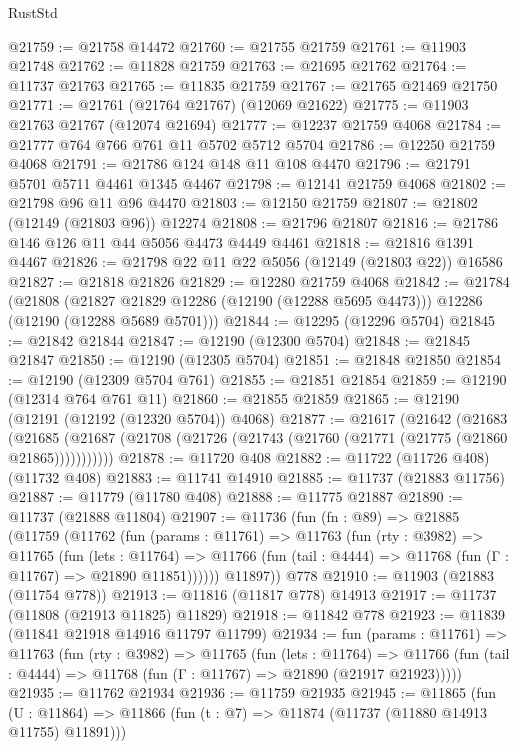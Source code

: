 \begin{lexlean}{RustStd}
\begin{coremodule}
@21759 := @21758 @14472
@21760 := @21755 @21759
@21761 := @11903 @21748
@21762 := @11828 @21759
@21763 := @21695 @21762
@21764 := @11737 @21763
@21765 := @11835 @21759
@21767 := @21765 @21469 @21750
@21771 := @21761 (@21764 @21767) (@12069 @21622)
@21775 := @11903 @21763 @21767 (@12074 @21694)
@21777 := @12237 @21759 @4068
@21784 := @21777 @764 @766 @761 @11 @5702 @5712 @5704
@21786 := @12250 @21759 @4068
@21791 := @21786 @124 @148 @11 @108 @4470
@21796 := @21791 @5701 @5711 @4461 @1345 @4467
@21798 := @12141 @21759 @4068
@21802 := @21798 @96 @11 @96 @4470
@21803 := @12150 @21759
@21807 := @21802 (@12149 (@21803 @96)) @12274
@21808 := @21796 @21807
@21816 := @21786 @146 @126 @11 @44 @5056 @4473 @4449 @4461
@21818 := @21816 @1391 @4467
@21826 := @21798 @22 @11 @22 @5056 (@12149 (@21803 @22)) @16586
@21827 := @21818 @21826
@21829 := @12280 @21759 @4068
@21842 := @21784
    (@21808
      (@21827 @21829 @12286 (@12190 (@12288 @5695 @4473)))
      @12286
      (@12190 (@12288 @5689 @5701)))
@21844 := @12295 (@12296 @5704)
@21845 := @21842 @21844
@21847 := @12190 (@12300 @5704)
@21848 := @21845 @21847
@21850 := @12190 (@12305 @5704)
@21851 := @21848 @21850
@21854 := @12190 (@12309 @5704 @761)
@21855 := @21851 @21854
@21859 := @12190 (@12314 @764 @761 @11)
@21860 := @21855 @21859
@21865 := @12190 (@12191 (@12192 (@12320 @5704)) @4068)
@21877 := @21617
    (@21642
      (@21683
        (@21685 (@21687 (@21708 (@21726 (@21743 (@21760 (@21771 (@21775 (@21860 @21865)))))))))))
@21878 := @11720 @408
@21882 := @11722 (@11726 @408) (@11732 @408)
@21883 := @11741 @14910
@21885 := @11737 (@21883 @11756)
@21887 := @11779 (@11780 @408)
@21888 := @11775 @21887
@21890 := @11737 (@21888 @11804)
@21907 := @11736
    (fun (fn : @89) =>
    @21885
      (@11759
        (@11762
          (fun (params : @11761) =>
          @11763
            (fun (rty : @3982) =>
            @11765
              (fun (lets : @11764) =>
              @11766 (fun (tail : @4444) => @11768 (fun (Γ : @11767) => @21890 @11851))))))
        @11897))
    @778
@21910 := @11903 (@21883 (@11754 @778))
@21913 := @11816 (@11817 @778) @14913
@21917 := @11737 (@11808 (@21913 @11825) @11829)
@21918 := @11842 @778
@21923 := @11839 (@11841 @21918 @14916 @11797 @11799)
@21934 := fun (params : @11761) =>
  @11763
    (fun (rty : @3982) =>
    @11765
      (fun (lets : @11764) =>
      @11766 (fun (tail : @4444) => @11768 (fun (Γ : @11767) => @21890 (@21917 @21923)))))
@21935 := @11762 @21934
@21936 := @11759 @21935
@21945 := @11865
    (fun (U : @11864) => @11866 (fun (t : @7) => @11874 (@11737 (@11880 @14913 @11755) @11891)))

\end{coremodule}
\end{lexlean}
